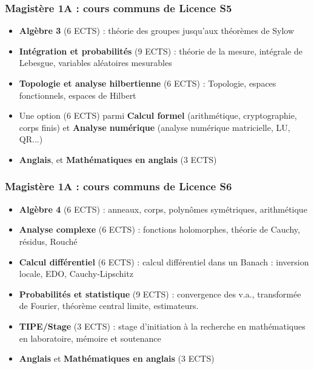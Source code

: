 \documentclass[slidetop,11pt]{beamer}
\begin{document}
\begin{frame}
\frametitle{Magistère 1A : cours communs de Licence S5}
\begin{itemize}
\item \textbf{Algèbre 3} (6 ECTS) : théorie des groupes jusqu'aux théorèmes de Sylow
\item \textbf{Intégration et probabilités} (9 ECTS) : théorie de la mesure, intégrale de Lebesgue, variables aléatoires mesurables
\item \textbf{Topologie et analyse hilbertienne} (6 ECTS) : Topologie, espaces fonctionnels, espaces de Hilbert
\item Une option (6 ECTS) parmi \textbf{Calcul formel} (arithmétique, cryptographie, corps finis) et \textbf{Analyse numérique} (analyse numérique matricielle, LU, QR...)
\item \textbf{Anglais}, et \textbf{Mathématiques en anglais} (3 ECTS)
\end{itemize}
\end{frame}


\begin{frame}
\frametitle{Magistère 1A : cours communs de Licence S6}


\begin{itemize}
\item \textbf{Algèbre 4} (6 ECTS) : anneaux, corps, polynômes symétriques, arithmétique
\item \textbf{Analyse complexe} (6 ECTS) : fonctions holomorphes, théorie de Cauchy, résidus, Rouché
\item \textbf{Calcul différentiel} (6 ECTS) : calcul différentiel dans un Banach : inversion locale, EDO, Cauchy-Lipschitz
\item \textbf{Probabilités et statistique} (9 ECTS) : convergence des v.a., transformée de Fourier, théorème central limite, estimateurs.
\item \textbf{TIPE/Stage} (3 ECTS) : stage d'initiation à la recherche en mathématiques en laboratoire, mémoire et soutenance
\item \textbf{Anglais} et \textbf{Mathématiques en anglais} (3 ECTS)
\end{itemize}
\end{frame}
\end{document}
